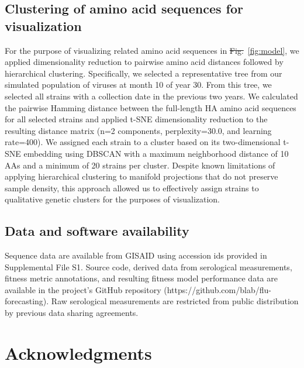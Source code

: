 \documentclass[9pt,lineno]{elife} %
\providecommand{\DIFadd}[1]{{\protect\color{blue}\uwave{#1}}} %
\providecommand{\DIFdel}[1]{{\protect\color{red}\sout{#1}}}                      %
\providecommand{\DIFaddbegin}{} %
\providecommand{\DIFaddend}{} %
\providecommand{\DIFdelbegin}{} %
\providecommand{\DIFdelend}{} %
\providecommand{\DIFaddtex}[1]{{\protect\color{blue}\uwave{#1}}} %
\providecommand{\DIFdeltex}[1]{{\protect\color{red}\sout{#1}}}                      %
\providecommand{\DIFaddbegin}{} %
\providecommand{\DIFaddend}{} %
\providecommand{\DIFdelbegin}{} %
\providecommand{\DIFdelend}{} %
\providecommand{\DIFadd}[1]{\texorpdfstring{\DIFaddtex{#1}}{#1}} %
\providecommand{\DIFdel}[1]{\texorpdfstring{\DIFdeltex{#1}}{}} %
\newcommand{\DIFscaledelfig}{0.5}
\newlength{\DIFdelgraphicswidth} %
\newlength{\DIFdelgraphicsheight} %
\newcommand{\DIFaddincludegraphics}[2][]{{\color{blue}\fbox{\DIFOincludegraphics[#1]{#2}}}} %
\newcommand{\DIFdelincludegraphics}[2][]{%
\sbox{\DIFdelgraphicsbox}{\DIFOincludegraphics[#1]{#2}}%
\settoboxwidth{\DIFdelgraphicswidth}{\DIFdelgraphicsbox} %
\settoboxtotalheight{\DIFdelgraphicsheight}{\DIFdelgraphicsbox} %
\scalebox{\DIFscaledelfig}{%
\parbox[b]{\DIFdelgraphicswidth}{\usebox{\DIFdelgraphicsbox}\\[-\baselineskip] \rule{\DIFdelgraphicswidth}{0em}}\llap{\resizebox{\DIFdelgraphicswidth}{\DIFdelgraphicsheight}{%
\setlength{\unitlength}{\DIFdelgraphicswidth}%
\begin{picture}(1,1)%
\thicklines\linethickness{2pt} %
{\color[rgb]{1,0,0}\put(0,0){\framebox(1,1){}}}%
{\color[rgb]{1,0,0}\put(0,0){\line( 1,1){1}}}%
{\color[rgb]{1,0,0}\put(0,1){\line(1,-1){1}}}%
\end{picture}%
}\hspace*{3pt}}} %
} %
\DeclareRobustCommand{\DIFaddbegin}{\DIFOaddbegin \let\includegraphics\DIFaddincludegraphics} %
\DeclareRobustCommand{\DIFaddend}{\DIFOaddend \let\includegraphics\DIFOincludegraphics} %
\DeclareRobustCommand{\DIFdelbegin}{\DIFOdelbegin \let\includegraphics\DIFdelincludegraphics} %
\DeclareRobustCommand{\DIFdelend}{\DIFOaddend \let\includegraphics\DIFOincludegraphics} %
\begin{document}
\DIFaddend \subsection*{Clustering of amino acid sequences for visualization}

For the purpose of visualizing related amino acid sequences in \DIFdelbegin \DIFdel{Fig.}\DIFdelend \DIFaddbegin \DIFadd{Figure}\DIFaddend ~\ref{fig:model}, we applied dimensionality reduction to pairwise amino acid distances followed by hierarchical clustering.
Specifically, we selected a representative tree from our simulated population of viruses at month 10 of year 30.
From this tree, we selected all strains with a collection date in the previous two years.
We calculated the pairwise Hamming distance between the full-length HA amino acid sequences for all selected strains and applied t-SNE dimensionality reduction \DIFdelbegin %
\DIFdelend \DIFaddbegin \citep{vanDerMaaten2008} \DIFaddend to the resulting distance matrix (n=2 components, perplexity=30.0, and learning rate=400).
We assigned each strain to a cluster based on its two-dimensional t-SNE embedding using DBSCAN \DIFdelbegin %
\DIFdelend \DIFaddbegin \citep{Ester1996} \DIFaddend with a maximum neighborhood distance of 10 AAs and a minimum of 20 strains per cluster.
Despite known limitations of applying hierarchical clustering to manifold projections that do not preserve sample density, this approach allowed us to effectively assign strains to qualitative genetic clusters for the purposes of visualization.

\subsection*{Data and software availability}

Sequence data are available from GISAID using accession ids provided in Supplemental File S1.
Source code, derived data from serological measurements, fitness metric annotations, and resulting fitness model performance data are available in the project's GitHub repository (https://github.com/blab/flu-forecasting).
Raw serological measurements are restricted from public distribution by previous data sharing agreements.

\section*{Acknowledgments}
\end{document}
